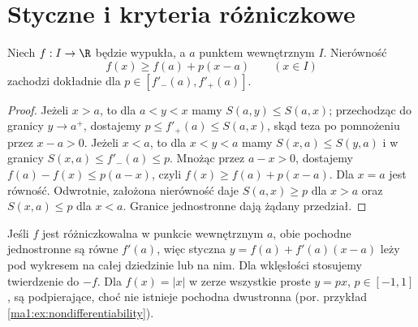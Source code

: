 \section{Styczne i kryteria różniczkowe}
\begin{twierdzenie}
\label{ma1:thm:convex-support}
Niech $f:I\to\R$ będzie wypukła, a $a$ punktem wewnętrznym $I$. Nierówność
\[
 f(x)\ge f(a)+p(x-a)\qquad(x\in I)
\]
zachodzi dokładnie dla $p\in[f'_-(a),f'_+(a)]$.
\end{twierdzenie}
\begin{proof}
Jeżeli $x>a$, to dla $a<y<x$ mamy $S(a,y)\le S(a,x)$; przechodząc do granicy $y\to a^+$, dostajemy $p\le f'_+(a)\le S(a,x)$, skąd teza po pomnożeniu przez $x-a>0$. Jeżeli $x<a$, to dla $x<y<a$ mamy $S(x,a)\le S(y,a)$ i w granicy $S(x,a)\le f'_-(a)\le p$. Mnożąc przez $a-x>0$, dostajemy $f(a)-f(x)\le p(a-x)$, czyli $f(x)\ge f(a)+p(x-a)$. Dla $x=a$ jest równość. Odwrotnie, założona nierówność daje $S(a,x)\ge p$ dla $x>a$ oraz $S(x,a)\le p$ dla $x<a$. Granice jednostronne dają żądany przedział.
\end{proof}
Jeśli $f$ jest różniczkowalna w punkcie wewnętrznym $a$, obie pochodne jednostronne są równe $f'(a)$, więc styczna $y=f(a)+f'(a)(x-a)$ leży pod wykresem na całej dziedzinie lub na nim. Dla wklęsłości stosujemy twierdzenie do $-f$. Dla $f(x)=|x|$ w zerze wszystkie proste $y=px$, $p\in[-1,1]$, są podpierające, choć nie istnieje pochodna dwustronna (por. przykład \ref{ma1:ex:nondifferentiability}).

